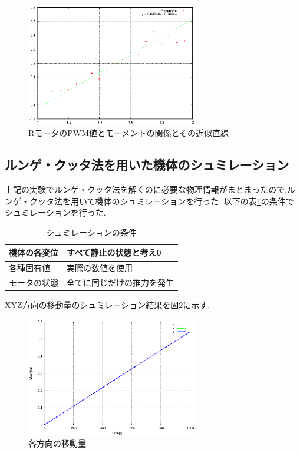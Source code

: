 \documentclass[12pt,oneside]{sotsuken_paper}
\begin{document}
\begin{figure}[htbp]
	\begin{center}
		\includegraphics[width=75mm]{image/moment/moment.eps}
		\caption{RモータのPWM値とモーメントの関係とその近似直線}
		\label{fig:moment-R}
	\end{center}
\end{figure}

\subsection{ルンゲ・クッタ法を用いた機体のシュミレーション}
上記の実験でルンゲ・クッタ法を解くのに必要な物理情報がまとまったので,ルンゲ・クッタ法を用いて機体のシュミレーションを行った.
以下の表\ref{table:syumi}の条件でシュミレーションを行った.

\begin{table}[htbp]
	\begin{center}
		\caption{シュミレーションの条件}
		\begin{tabular}{|l|l|} \hline
			機体の各変位 & すべて静止の状態と考え0 \\ \hline 
			各種固有値 & 実際の数値を使用 \\ \hline
			モータの状態 & 全てに同じだけの推力を発生 \\ \hline
		\end{tabular}
		\label{table:syumi}
	\end{center}
\end{table}

XYZ方向の移動量のシュミレーション結果を図\ref{fig:UVW}に示す.

\begin{figure}[htbp]
	\begin{center}
		\includegraphics[width=75mm]{image/UVW.eps}
		\caption{各方向の移動量}
		\label{fig:UVW}
	\end{center}
\end{figure}
\end{document}
